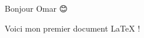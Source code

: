 \documentclass{article}
\begin{document}
Bonjour Omar 😊

Voici mon premier document LaTeX !
\end{document}
